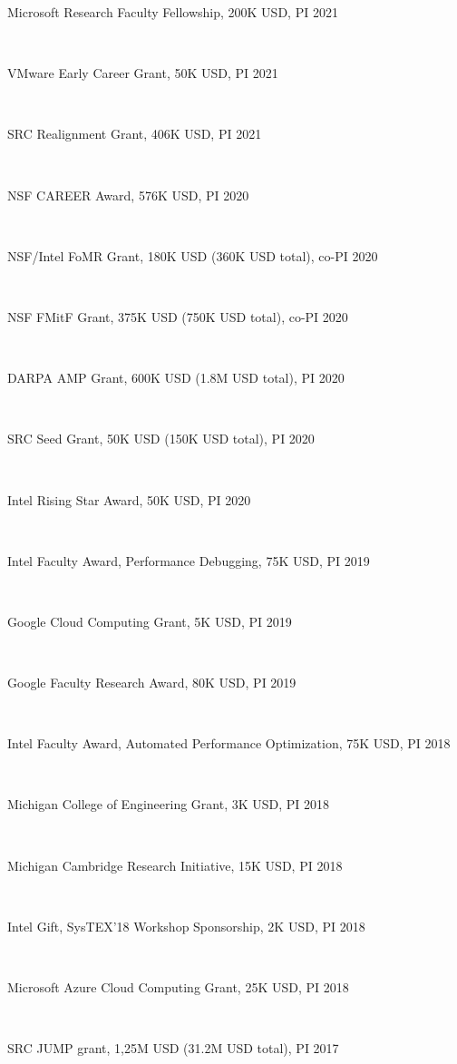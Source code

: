 \documentclass[10pt]{article}
\newcommand{\mysec}[1]{\vspace{2em}\textsc{\large #1}\vspace{1mm}\hrule\vspace{2mm}}
\newcommand{\myssub}[1]{\hspace*{2mm}\parbox{163mm}{#1}\vspace*{2mm}}
\begin{document}
\myssub{Microsoft Research Faculty Fellowship, 200K USD, PI \hfill 2021} \\
\myssub{VMware Early Career Grant, 50K USD, PI \hfill 2021} \\
\myssub{SRC Realignment Grant, 406K USD, PI \hfill 2021} \\
\myssub{NSF CAREER Award, 576K USD, PI \hfill 2020} \\
\myssub{NSF/Intel FoMR Grant, 180K USD (360K USD total), co-PI \hfill 2020} \\
\myssub{NSF FMitF Grant, 375K USD (750K USD total), co-PI \hfill 2020} \\
\myssub{DARPA AMP Grant, 600K USD (1.8M USD total), PI \hfill 2020} \\
\myssub{SRC Seed Grant, 50K USD (150K USD total), PI \hfill 2020} \\
\myssub{Intel Rising Star Award, 50K USD, PI \hfill 2020} \\
\myssub{Intel Faculty Award, Performance Debugging, 75K USD, PI \hfill 2019} \\
\myssub{Google Cloud Computing Grant, 5K USD, PI \hfill 2019} \\
\myssub{Google Faculty Research Award, 80K USD, PI \hfill 2019} \\
\myssub{Intel Faculty Award, Automated Performance Optimization, 75K USD, PI \hfill 2018} \\
\myssub{Michigan College of Engineering Grant, 3K USD, PI \hfill 2018} \\
\myssub{Michigan Cambridge Research Initiative, 15K USD, PI \hfill 2018} \\
\myssub{Intel Gift, SysTEX'18 Workshop Sponsorship, 2K USD, PI \hfill 2018} \\
\myssub{Microsoft Azure Cloud Computing Grant, 25K USD, PI \hfill 2018} \\
\myssub{SRC JUMP grant, 1,25M USD (31.2M USD total), PI \hfill 2017} \\

\end{document}

